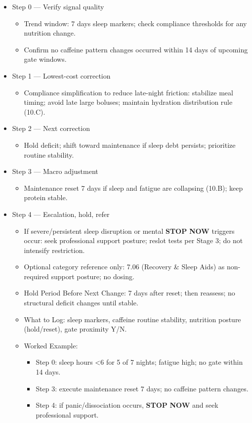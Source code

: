 \documentclass[10pt]{article}
\begin{document}
\begin{itemize}
\item Step 0 — Verify signal quality
  \begin{itemize}
  \item Trend window: 7 days sleep markers; check compliance thresholds for any nutrition change.
  \item Confirm no caffeine pattern changes occurred within 14 days of upcoming gate windows.
  \end{itemize}
\item Step 1 — Lowest-cost correction
  \begin{itemize}
  \item Compliance simplification to reduce late-night friction: stabilize meal timing; avoid late large boluses; maintain hydration distribution rule (10.C).
  \end{itemize}
\item Step 2 — Next correction
  \begin{itemize}
  \item Hold deficit; shift toward maintenance if sleep debt persists; prioritize routine stability.
  \end{itemize}
\item Step 3 — Macro adjustment
  \begin{itemize}
  \item Maintenance reset 7 days if sleep and fatigue are collapsing (10.B); keep protein stable.
  \end{itemize}
\item Step 4 — Escalation, hold, refer
  \begin{itemize}
  \item If severe/persistent sleep disruption or mental \textbf{STOP} \textbf{NOW} triggers occur: seek professional support posture; reslot tests per Stage 3; do not intensify restriction.
  \item Optional category reference only: 7.06 (Recovery \& Sleep Aids) as non-required support posture; no dosing.
  \item Hold Period Before Next Change: 7 days after reset; then reassess; no structural deficit changes until stable.
  \item What to Log: sleep markers, caffeine routine stability, nutrition posture (hold/reset), gate proximity Y/N.
  \item Worked Example:
    \begin{itemize}
    \item Step 0: sleep hours \textless6 for 5 of 7 nights; fatigue high; no gate within 14 days.
    \item Step 3: execute maintenance reset 7 days; no caffeine pattern changes.
    \item Step 4: if panic/dissociation occurs, \textbf{STOP} \textbf{NOW} and seek professional support.
    \end{itemize}
  \end{itemize}
\end{itemize}
\end{document}
